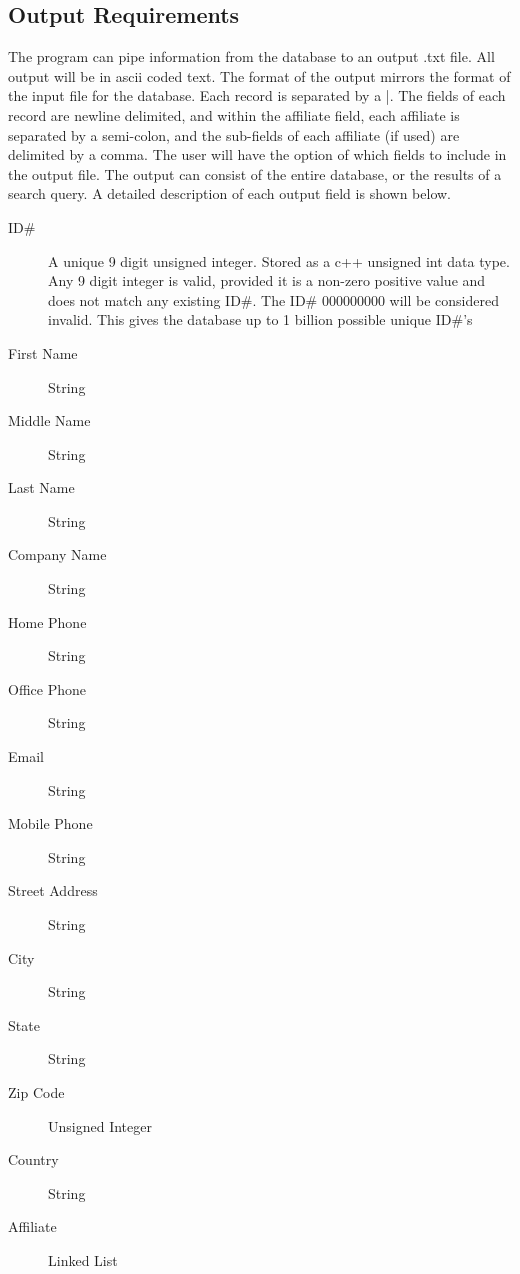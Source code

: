 \documentclass[11pt]{article}
\begin{document}
	 
	
	


\subsection*{Output Requirements}

	The program can pipe information from the database to an output .txt file. All output will be in ascii
coded text. The format of the output mirrors the format of the input file for the database. Each record is separated by a |.
The fields of each record are newline delimited, and within the affiliate field, each affiliate is separated by a semi-colon,
 and the sub-fields of each affiliate (if used) are delimited by a comma. The user will have the option of which fields to 
include in the output file. The output can consist of the entire database, or the results of a search query. A detailed
 description of each output field is shown below.

	\begin{description}
	
		\item[ID\#] A unique 9 digit unsigned integer. Stored as a c++ unsigned int data type. Any 9 digit integer is valid, 
					provided it is a non-zero positive value and does not match any existing ID\#. The ID\# 000000000 will
					be considered invalid. This gives the database up to 1 billion possible unique ID\#'s
					 
		\item[First Name] String
		\item[Middle Name] String
		\item[Last Name] String
		\item[Company Name] String
		\item[Home Phone] String
		\item[Office Phone] String
		\item[Email] String
		\item[Mobile Phone] String
		\item[Street Address] String
		\item[City] String
		\item[State] String
		\item[Zip Code] Unsigned Integer
		\item[Country] String
		
		\item[Affiliate] Linked List
		
	\end{description}
\end{document}
